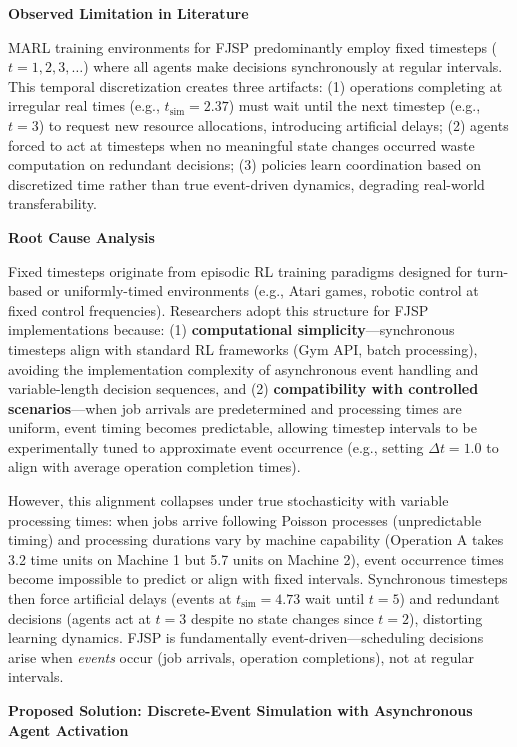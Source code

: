 \textbf{Observed Limitation in Literature}

MARL training environments for FJSP predominantly employ fixed timesteps (\( t = 1, 2, 3, \ldots \)) where all agents make decisions synchronously at regular intervals. This temporal discretization creates three artifacts: (1) operations completing at irregular real times (e.g., \( t_{\text{sim}} = 2.37 \)) must wait until the next timestep (e.g., \( t = 3 \)) to request new resource allocations, introducing artificial delays; (2) agents forced to act at timesteps when no meaningful state changes occurred waste computation on redundant decisions; (3) policies learn coordination based on discretized time rather than true event-driven dynamics, degrading real-world transferability.

\textbf{Root Cause Analysis}

Fixed timesteps originate from episodic RL training paradigms designed for turn-based or uniformly-timed environments (e.g., Atari games, robotic control at fixed control frequencies). Researchers adopt this structure for FJSP implementations because: (1) \textbf{computational simplicity}—synchronous timesteps align with standard RL frameworks (Gym API, batch processing), avoiding the implementation complexity of asynchronous event handling and variable-length decision sequences, and (2) \textbf{compatibility with controlled scenarios}—when job arrivals are predetermined and processing times are uniform, event timing becomes predictable, allowing timestep intervals to be experimentally tuned to approximate event occurrence (e.g., setting \( \Delta t = 1.0 \) to align with average operation completion times).

However, this alignment collapses under true stochasticity with variable processing times: when jobs arrive following Poisson processes (unpredictable timing) and processing durations vary by machine capability (Operation A takes 3.2 time units on Machine 1 but 5.7 units on Machine 2), event occurrence times become impossible to predict or align with fixed intervals. Synchronous timesteps then force artificial delays (events at \( t_{\text{sim}} = 4.73 \) wait until \( t = 5 \)) and redundant decisions (agents act at \( t = 3 \) despite no state changes since \( t = 2 \)), distorting learning dynamics. FJSP is fundamentally event-driven—scheduling decisions arise when \textit{events} occur (job arrivals, operation completions), not at regular intervals.

\textbf{Proposed Solution: Discrete-Event Simulation with Asynchronous Agent Activation}

